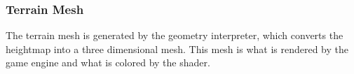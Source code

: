 \documentclass[onecolumn, draftclsnofoot,10pt, compsoc]{IEEEtran}
\begin{document}
\subsubsection{Terrain Mesh}
The terrain mesh is generated by the geometry interpreter, which converts the heightmap into a three dimensional mesh. This mesh is what is rendered by the game engine and what is colored by the shader.




\pagebreak



\end{document}

